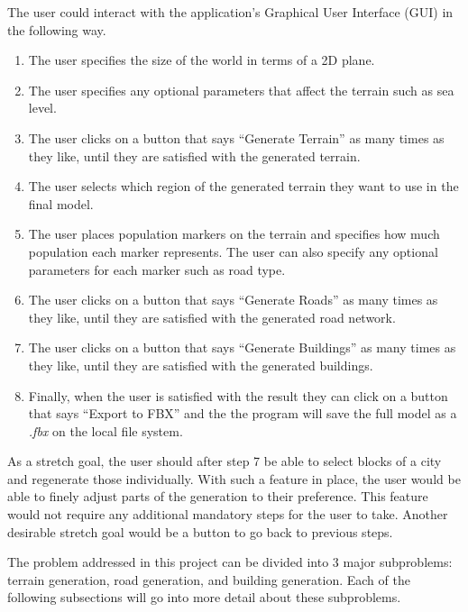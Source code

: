 The user could interact with the application's Graphical User Interface (GUI) in the following way.
\begin{enumerate}
  \item The user specifies the size of the world in terms of a 2D plane.
  \item The user specifies any optional parameters that affect the terrain
    such as sea level.
  \item The user clicks on a button that says ``Generate Terrain'' as many times
    as they like, until they are satisfied with the generated terrain.
  \item The user selects which region of the generated terrain they want to use in the final model.
  \item The user places population markers on the terrain and specifies how much
    population each marker represents. The user can also specify any optional parameters for each marker such as road type.
  \item The user clicks on a button that says ``Generate Roads'' as many times
    as they like, until they are satisfied with the generated road network.
  \item The user clicks on a button that says ``Generate Buildings'' as many times
    as they like, until they are satisfied with the generated buildings.
  \item Finally, when the user is satisfied with the result they can click on a
    button that says ``Export to FBX'' and the the program will save the full
    model as a \textit{.fbx} on the local file system.
\end{enumerate}

As a stretch goal, the user should after step 7 be able to select blocks of a city and regenerate those individually.
With such a feature in place, the user would be able to finely adjust parts of the generation to their preference.
This feature would not require any additional mandatory steps for the user to take.
Another desirable stretch goal would be a button to go back to previous steps.

The problem addressed in this project can be divided into 3 major subproblems: terrain generation, road generation, and building generation.
Each of the following subsections will go into more detail about these subproblems.

\newpage

\newpage

\newpage
